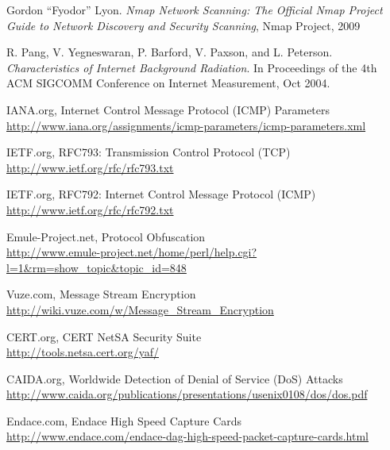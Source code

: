 \documentclass[a4paper]{scrartcl}
\begin{document}
\newpage
\begin{thebibliography}{9}

	 Gordon ``Fyodor'' Lyon. \emph{Nmap Network Scanning: The Official Nmap Project Guide to Network Discovery and Security Scanning},
	Nmap Project,
	2009
	
	 R. Pang, V. Yegneswaran, P. Barford, V. Paxson, and L. Peterson. \emph{Characteristics of Internet Background Radiation}. In Proceedings of the 4th ACM SIGCOMM Conference on Internet Measurement, Oct 2004.
	
	 IANA.org, Internet Control Message Protocol (ICMP) Parameters \\
	\url{http://www.iana.org/assignments/icmp-parameters/icmp-parameters.xml}
	
	 IETF.org, RFC793: Transmission Control Protocol (TCP) \\
	\url{http://www.ietf.org/rfc/rfc793.txt}
	
	 IETF.org, RFC792: Internet Control Message Protocol (ICMP) \\
	\url{http://www.ietf.org/rfc/rfc792.txt}
	
	 Emule-Project.net, Protocol Obfuscation \\
	\url{http://www.emule-project.net/home/perl/help.cgi?l=1&rm=show_topic&topic_id=848}
	
	 Vuze.com, Message Stream Encryption \\
	\url{http://wiki.vuze.com/w/Message_Stream_Encryption}
	
	 CERT.org, CERT NetSA Security Suite \\
	\url{http://tools.netsa.cert.org/yaf/}
	
	 CAIDA.org, Worldwide Detection of Denial of Service (DoS) Attacks \\
	\url{http://www.caida.org/publications/presentations/usenix0108/dos/dos.pdf}
	
	 Endace.com, Endace High Speed Capture Cards \\
	\url{http://www.endace.com/endace-dag-high-speed-packet-capture-cards.html}
	
\end{thebibliography}
\end{document}
